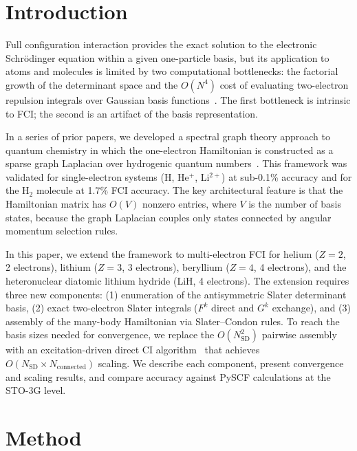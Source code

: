 \documentclass[aps,pra,twocolumn,superscriptaddress,longbibliography,floatfix]{revtex4-2}
\begin{document}
\section{Introduction}
\label{sec:introduction}

Full configuration interaction provides the exact solution to the
electronic Schr\"odinger equation within a given one-particle basis,
but its application to atoms and molecules is limited by two
computational bottlenecks: the factorial growth of the determinant
space and the $O(N^4)$ cost of evaluating two-electron repulsion
integrals over Gaussian basis functions~\cite{Szabo1996,Helgaker2000}.
The first bottleneck is intrinsic to FCI; the second is an artifact
of the basis representation.

In a series of prior papers, we developed a spectral graph theory
approach to quantum chemistry in which the one-electron Hamiltonian
is constructed as a sparse graph Laplacian over hydrogenic quantum
numbers~\cite{Loutey2026a,Loutey2026b,Loutey2026c}.
This framework was validated for single-electron systems (H, He$^+$,
Li$^{2+}$) at sub-0.1\% accuracy and for the H$_2$ molecule at
1.7\% FCI accuracy.
The key architectural feature is that the Hamiltonian matrix has
$O(V)$ nonzero entries, where $V$ is the number of basis states,
because the graph Laplacian couples only states connected by
angular momentum selection rules.

In this paper, we extend the framework to multi-electron FCI for
helium ($Z=2$, 2 electrons), lithium ($Z=3$, 3 electrons),
beryllium ($Z=4$, 4 electrons), and the heteronuclear diatomic
lithium hydride (LiH, 4 electrons).
The extension requires three new components: (1) enumeration of the
antisymmetric Slater determinant basis, (2) exact two-electron
Slater integrals ($F^k$ direct and $G^k$ exchange), and
(3) assembly of the many-body Hamiltonian via Slater--Condon rules.
To reach the basis sizes needed for convergence, we replace the
$O(N_{\text{SD}}^2)$ pairwise assembly with an excitation-driven
direct CI algorithm~\cite{Knowles1984} that achieves
$O(N_{\text{SD}} \times N_{\text{connected}})$ scaling.
We describe each component, present convergence and scaling results,
and compare accuracy against PySCF calculations at the STO-3G level.

\section{Method}
\label{sec:method}
\end{document}
